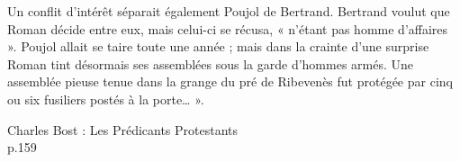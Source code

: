 \begin{tcolorbox}[
  colback=white,
  colframe=black,
  boxrule=0.7pt,
  arc=0pt,
  left=0.20cm,
  right=0.20cm,
  top=0.10cm,
  bottom=0.10cm,
  boxsep=0pt
]
Un conflit d’intérêt séparait également Poujol de Bertrand. Bertrand voulut que Roman décide entre eux, mais celui-ci se récusa, « n’étant pas homme d’affaires ». Poujol allait se taire toute une année ; mais dans la crainte d’une surprise Roman tint désormais ses assemblées sous la garde d’hommes armés. Une assemblée pieuse tenue dans la grange du pré de Ribevenès fut protégée par cinq ou six fusiliers postés à la porte… ».

\begin{flushright}
Charles Bost : Les Prédicants Protestants\\[-0.1em]
{\scriptsize p.159}
\end{flushright}

\end{tcolorbox}

